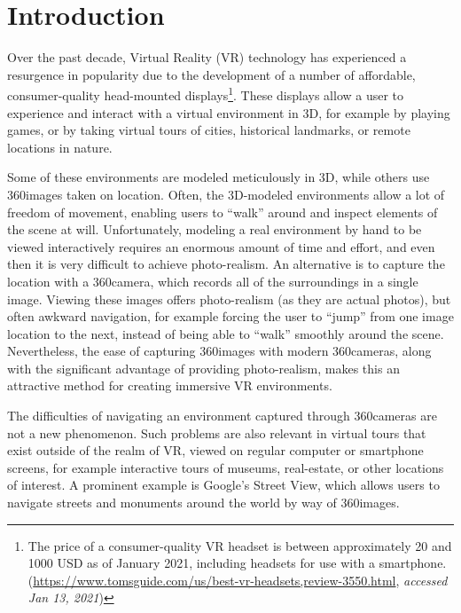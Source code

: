 \chapter{Introduction}

Over the past decade, Virtual Reality (VR) technology has experienced a resurgence in popularity due to the development of a number of affordable, consumer-quality head-mounted displays\footnote{The price of a consumer-quality VR headset is between approximately 20 and 1000 USD as of January 2021, including headsets for use with a smartphone. \\(\url{https://www.tomsguide.com/us/best-vr-headsets,review-3550.html}, \emph{accessed Jan 13, 2021})}. These displays allow a user to experience and interact with a virtual environment in 3D, for example by playing games, or by taking virtual tours of cities, historical landmarks, or remote locations in nature.

Some of these environments are modeled meticulously in 3D, while others use 360\degree images taken on location. Often, the 3D-modeled environments allow a lot of freedom of movement, enabling users to ``walk'' around and inspect elements of the scene at will. Unfortunately, modeling a real environment by hand to be viewed interactively requires an enormous amount of time and effort, and even then it is very difficult to achieve photo-realism. An alternative is to capture the location with a 360\degree camera, which records all of the surroundings in a single image. Viewing these images offers photo-realism (as they are actual photos), but often awkward navigation, for example forcing the user to ``jump'' from one image location to the next, instead of being able to ``walk'' smoothly around the scene. Nevertheless, the ease of capturing 360\degree images with modern 360\degree cameras, along with the significant advantage of providing photo-realism, makes this an attractive method for creating immersive VR environments.

The difficulties of navigating an environment captured through 360\degree cameras are not a new phenomenon. Such problems are also relevant in virtual tours that exist outside of the realm of VR, viewed on regular computer or smartphone screens, for example interactive tours of museums, real-estate, or other locations of interest. A prominent example is Google's Street View, which allows users to navigate streets and monuments around the world by way of 360\degree images.

